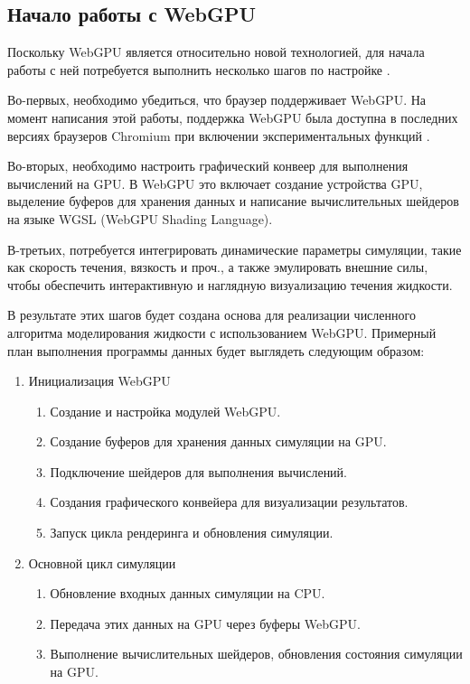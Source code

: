 \subsection{Начало работы с WebGPU}

Поскольку WebGPU является относительно новой технологией, для начала работы с ней потребуется выполнить несколько шагов по настройке \cite{webgpufundamentals}.

Во-первых, необходимо убедиться, что браузер поддерживает WebGPU. На момент написания этой работы, поддержка WebGPU была доступна в последних версиях браузеров Chromium при включении экспериментальных функций \cite{webgpustatus}.

Во-вторых, необходимо настроить графический конвеер для выполнения вычислений на GPU. В WebGPU это включает создание устройства GPU, выделение буферов для хранения данных и написание вычислительных шейдеров на языке WGSL (WebGPU Shading Language).

В-третьих, потребуется интегрировать динамические параметры симуляции, такие как скорость течения, вязкость и проч., а также эмулировать внешние силы, чтобы обеспечить интерактивную и наглядную визуализацию течения жидкости.

В результате этих шагов будет создана основа для реализации численного алгоритма моделирования жидкости с использованием WebGPU. Примерный план выполнения программы данных будет выглядеть следующим образом:
\begin{enumerate}
    \item Инициализация WebGPU
          \begin{enumerate}
              \item Создание и настройка модулей WebGPU.
              \item Создание буферов для хранения данных симуляции на GPU.
              \item Подключение шейдеров для выполнения вычислений.
              \item Создания графического конвейера для визуализации результатов.
              \item Запуск цикла рендеринга и обновления симуляции.
          \end{enumerate}
    \item Основной цикл симуляции
          \begin{enumerate}
              \item Обновление входных данных симуляции на CPU.
              \item Передача этих данных на GPU через буферы WebGPU.
              \item Выполнение вычислительных шейдеров, обновления состояния симуляции на GPU.
          \end{enumerate}
\end{enumerate}



